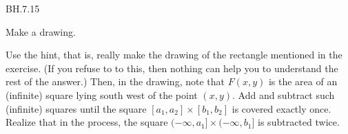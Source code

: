 
\setcounter{theorem}{14}
\begin{exercise}BH.7.15
\begin{hint}
Make a drawing.
\end{hint}
\begin{solution}
Use the hint, that is, really make the drawing of the rectangle mentioned in the exercise. (If you refuse to to this, then nothing can  help you to understand the rest of the answer.) Then, in the drawing, note that $F(x,y)$ is the area of an (infinite) square lying  south west of the point $(x,y)$. Add and subtract such (infinite) squares until the square $[a_1,a_2] \times [b_{1},b_2]$ is covered exactly once. Realize that in the process, the square $(-\infty, a_1] \times (-\infty, b_1]$ is subtracted twice.
\end{solution}
\end{exercise}

